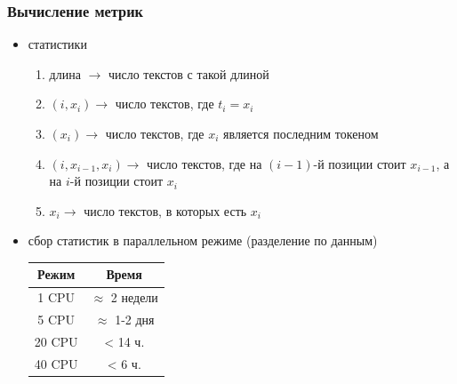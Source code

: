 \documentclass{beamer}
\begin{document}
\begin{frame}
	\frametitle{Вычисление метрик}
	\begin{itemize}
		\item статистики
			\begin{enumerate}
				\item длина $\rightarrow$ число текстов с такой длиной
				\item $(i, x_i) \rightarrow$ число текстов, где $t_i = x_i$ 
				\item $(x_i)\rightarrow$ число текстов, где $x_i$ является последним токеном
				\item $(i, x_{i-1}, x_i) \rightarrow$ число текстов, где на $(i-1)$-й позиции стоит $x_{i-1}$, а на $i$-й позиции стоит $x_i$
				\item $x_i \rightarrow$ число текстов, в которых есть $x_i$
			\end{enumerate}
		\item сбор статистик в параллельном режиме (разделение по данным)
			\begin{table}
				\begin{tabular}{|c|c|}
					\hline
					Режим & Время \\
					\hline
					1 CPU & $\approx$ 2 недели \\
					5 CPU & $\approx$ 1-2 дня \\
					20 CPU & < 14 ч. \\
					40 CPU & < 6 ч. \\
					\hline
				\end{tabular}
			\end{table}
	\end{itemize}
\end{frame}
\end{document}
